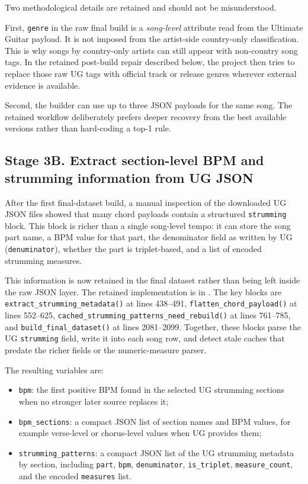 \documentclass[11pt]{article}
\begin{document}
Two methodological details are retained and should not be misunderstood.

First, \texttt{genre} in the raw final build is a \emph{song-level} attribute
read from the Ultimate Guitar payload. It is not imposed from the artist-side
country-only classification. This is why songs by country-only artists can
still appear with non-country song tags. In the retained post-build repair
described below, the project then tries to replace those raw UG tags with
official track or release genres wherever external evidence is available.

Second, the builder can use up to three JSON payloads for the same song. The
retained workflow deliberately prefers deeper recovery from the best available
versions rather than hard-coding a top-1 rule.

\subsection{Stage 3B. Extract section-level BPM and strumming information from UG JSON}
After the first final-dataset build, a manual inspection of the downloaded UG
JSON files showed that many chord payloads contain a structured
\texttt{strumming} block. This block is richer than a single song-level tempo:
it can store the song part name, a BPM value for that part, the denominator
field as written by UG (\texttt{denuminator}), whether the part is triplet-based,
and a list of encoded strumming measures.

This information is now retained in the final dataset rather than being left
inside the raw JSON layer. The retained implementation is in
.
The key blocks are \texttt{extract\_strumming\_metadata()} at lines 438--491,
\texttt{flatten\_chord\_payload()} at lines 552--625,
\texttt{cached\_strumming\_patterns\_need\_rebuild()} at lines 761--785, and
\texttt{build\_final\_dataset()} at lines 2081--2099. Together, these blocks
parse the UG \texttt{strumming} field, write it into each song row, and detect
stale caches that predate the richer fields or the numeric-measure parser.

The resulting variables are:
\begin{itemize}[leftmargin=2em]
\item \texttt{bpm}: the first positive BPM found in the selected UG strumming
sections when no stronger later source replaces it;
\item \texttt{bpm\_sections}: a compact JSON list of section names and BPM
values, for example verse-level or chorus-level values when UG provides them;
\item \texttt{strumming\_patterns}: a compact JSON list of the UG strumming
metadata by section, including \texttt{part}, \texttt{bpm},
\texttt{denuminator}, \texttt{is\_triplet}, \texttt{measure\_count}, and the
encoded \texttt{measures} list.
\end{itemize}
\end{document}

